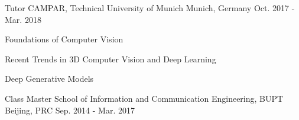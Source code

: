 


\begin{cventries}


\cventry
{Tutor} %
{CAMPAR, Technical University of Munich} %
{Munich, Germany} %
{Oct. 2017 - Mar. 2018} %
{ %
\begin{cvitems}
\item {Foundations of Computer Vision}
\item {Recent Trends in 3D Computer Vision and Deep Learning}
\item {Deep Generative Models}
\end{cvitems}
}

\cventry
{Class Master} %
{School of Information and Communication Engineering, BUPT} %
{Beijing, PRC} %
{Sep. 2014 - Mar. 2017} %
{
}


\end{cventries}
